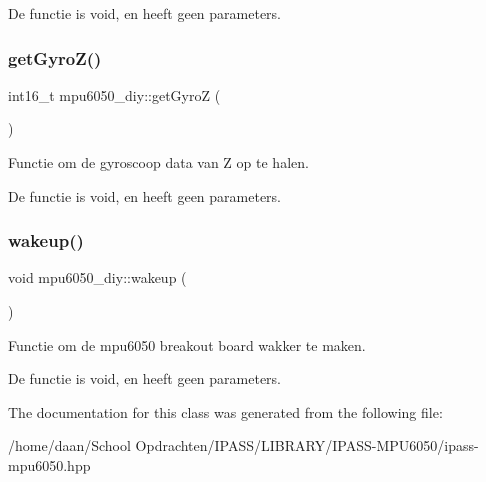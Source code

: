 De functie is void, en heeft geen parameters. \mbox{\label{classmpu6050__diy_a8cd5eabaff15a4fb17d06bc5d9b6f280}} 
\subsubsection{\texorpdfstring{get\+Gyro\+Z()}{getGyroZ()}}
{\footnotesize\ttfamily int16\+\_\+t mpu6050\+\_\+diy\+::get\+GyroZ (\begin{DoxyParamCaption}{ }\end{DoxyParamCaption})\hspace{0.3cm}{\ttfamily [inline]}}



Functie om de gyroscoop data van Z op te halen. 

De functie is void, en heeft geen parameters. \mbox{\label{classmpu6050__diy_ad641ac94fcef07143af1fa4e88a7d963}} 
\subsubsection{\texorpdfstring{wakeup()}{wakeup()}}
{\footnotesize\ttfamily void mpu6050\+\_\+diy\+::wakeup (\begin{DoxyParamCaption}{ }\end{DoxyParamCaption})\hspace{0.3cm}{\ttfamily [inline]}}



Functie om de mpu6050 breakout board wakker te maken. 

De functie is void, en heeft geen parameters. 

The documentation for this class was generated from the following file\+:\begin{DoxyCompactItemize}
\item 
/home/daan/\+School Opdrachten/\+I\+P\+A\+S\+S/\+L\+I\+B\+R\+A\+R\+Y/\+I\+P\+A\+S\+S-\/\+M\+P\+U6050/ipass-\/mpu6050.\+hpp\end{DoxyCompactItemize}
